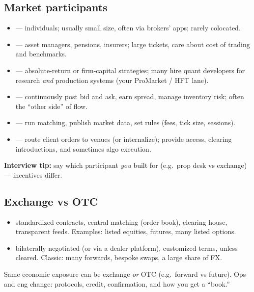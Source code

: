 \subsection{Market participants}
\label{subsec:market-participants}
\begin{itemize}
    \item {} --- individuals; usually small size, often via brokers' 
          apps; rarely colocated.
    \item {} --- asset managers, pensions, insurers; 
          large tickets, care about cost of trading and benchmarks.
    \item {} --- absolute-return or firm-capital 
          strategies; many hire quant developers for research \emph{and} production 
          systems (your ProMarket / HFT lane).
    \item {} --- continuously post bid and ask, earn spread, 
          manage inventory risk; often the ``other side'' of flow.
    \item {} --- run matching, publish market data, set 
          rules (fees, tick size, sessions).
    \item {} --- route client orders to venues (or internalize); 
          provide access, clearing introductions, and sometimes algo execution.
\end{itemize}
\par\noindent\textbf{Interview tip:} say which participant \emph{you} built for 
(e.g.\ prop desk vs exchange) --- incentives differ.

\subsection{Exchange vs OTC}
\label{sec:exchange-vs-otc}
\label{subsec:exchange-vs-otc}
\begin{itemize}
    \item {} standardized contracts, central matching 
          (order book), clearing house, transparent feeds. Examples: listed equities, 
          futures, many listed options.
    \item {} bilaterally negotiated (or via a 
          dealer platform), customized terms,  unless 
          cleared. Classic: many forwards, bespoke swaps, a large share of FX.
\end{itemize}
Same economic exposure can be exchange \emph{or} OTC (e.g.\ forward vs future). 
Ops and eng change: protocols, credit, confirmation, and how you get a ``book.''

